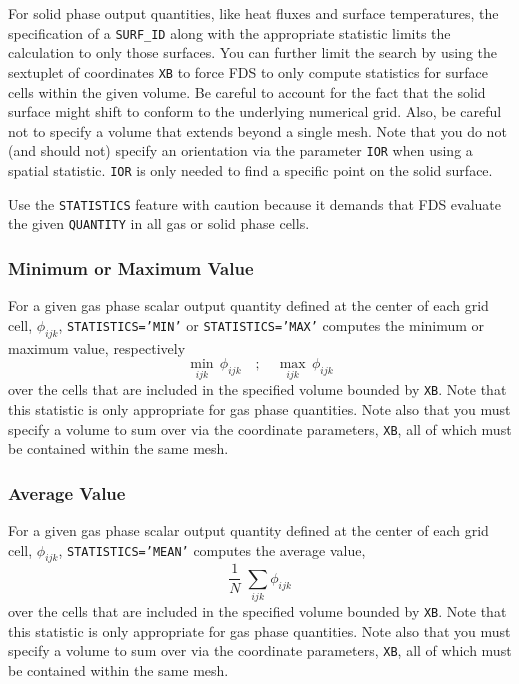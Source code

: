 \documentclass[11pt]{book}
\newcommand{\ct}{\tt\small}
\newcommand{\be}{\begin{equation}}
\newcommand{\ee}{\end{equation}}
\begin{document}
For solid phase output quantities, like heat fluxes and surface temperatures, the
specification of a {\ct SURF\_ID} along with the appropriate statistic limits the calculation to only those surfaces. You can further limit the search by using the
sextuplet of coordinates {\ct XB} to force FDS to only compute statistics for surface cells within the given volume. Be careful to
account for the fact that the solid surface might shift to conform to the underlying numerical grid. Also, be careful not to specify a
volume that extends beyond a single mesh. Note that you do not (and should not) specify an orientation via the parameter {\ct IOR} when using
a spatial statistic. {\ct IOR} is only needed to find a specific point on the solid surface.

\begin{warning}
\noindent
Use the {\ct STATISTICS} feature with caution because
it demands that FDS evaluate the given {\ct QUANTITY} in all gas or solid phase cells.
\end{warning}

\subsubsection{Minimum or Maximum Value}

For a given gas phase scalar output quantity defined at the center of each grid cell, $\phi_{ijk}$, {\ct STATISTICS='MIN'} or {\ct STATISTICS='MAX'}
computes the minimum or maximum value, respectively
\be \min_{ijk} \, \phi_{ijk} \quad ; \quad  \max_{ijk} \, \phi_{ijk} \ee
over the cells that are included in the specified volume bounded by {\ct XB}. Note that this
statistic is only appropriate for gas phase quantities. Note also that you must specify a volume to sum over via the
coordinate parameters, {\ct XB}, all of which must be contained within the same mesh.


\subsubsection{Average Value}

For a given gas phase scalar output quantity defined at the center of each grid cell, $\phi_{ijk}$, {\ct STATISTICS='MEAN'} computes the average value,
\be \frac{1}{N} \; \sum_{ijk} \phi_{ijk}  \ee
over the cells that are included in the specified volume bounded by {\ct XB}. Note that this
statistic is only appropriate for gas phase quantities. Note also that you must specify a volume to sum over via the
coordinate parameters, {\ct XB}, all of which must be contained within the same mesh.
\end{document}
